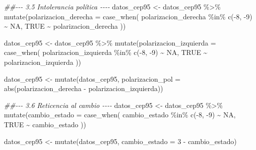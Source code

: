 \documentclass[
  spanish,
  a4paper,
  oneside]{scrbook}
\newenvironment{Shaded}{\begin{snugshade}}{\end{snugshade}}
\newcommand{\AttributeTok}[1]{\textcolor[rgb]{0.40,0.45,0.13}{#1}}
\newcommand{\ConstantTok}[1]{\textcolor[rgb]{0.56,0.35,0.01}{#1}}
\newcommand{\DecValTok}[1]{\textcolor[rgb]{0.68,0.00,0.00}{#1}}
\newcommand{\DocumentationTok}[1]{\textcolor[rgb]{0.37,0.37,0.37}{\textit{#1}}}
\newcommand{\FunctionTok}[1]{\textcolor[rgb]{0.28,0.35,0.67}{#1}}
\newcommand{\NormalTok}[1]{\textcolor[rgb]{0.00,0.23,0.31}{#1}}
\newcommand{\OtherTok}[1]{\textcolor[rgb]{0.00,0.23,0.31}{#1}}
\newcommand{\SpecialCharTok}[1]{\textcolor[rgb]{0.37,0.37,0.37}{#1}}
\begin{document}
\begin{Shaded}
\begin{Highlighting}[]
\DocumentationTok{\#\#{-}{-}{-} 3.5 Intolerancia política {-}{-}{-}{-}}
\NormalTok{datos\_cep95 }\OtherTok{\textless{}{-}}\NormalTok{ datos\_cep95 }\SpecialCharTok{\%\textgreater{}\%} 
  \FunctionTok{mutate}\NormalTok{(}\AttributeTok{polarizacion\_derecha =} \FunctionTok{case\_when}\NormalTok{(}
\NormalTok{    polarizacion\_derecha }\SpecialCharTok{\%in\%} \FunctionTok{c}\NormalTok{(}\SpecialCharTok{{-}}\DecValTok{8}\NormalTok{, }\SpecialCharTok{{-}}\DecValTok{9}\NormalTok{) }\SpecialCharTok{\textasciitilde{}} \ConstantTok{NA}\NormalTok{,}
    \ConstantTok{TRUE} \SpecialCharTok{\textasciitilde{}}\NormalTok{ polarizacion\_derecha}
\NormalTok{  ))}

\NormalTok{datos\_cep95 }\OtherTok{\textless{}{-}}\NormalTok{ datos\_cep95 }\SpecialCharTok{\%\textgreater{}\%} 
  \FunctionTok{mutate}\NormalTok{(}\AttributeTok{polarizacion\_izquierda =} \FunctionTok{case\_when}\NormalTok{(}
\NormalTok{    polarizacion\_izquierda }\SpecialCharTok{\%in\%} \FunctionTok{c}\NormalTok{(}\SpecialCharTok{{-}}\DecValTok{8}\NormalTok{, }\SpecialCharTok{{-}}\DecValTok{9}\NormalTok{) }\SpecialCharTok{\textasciitilde{}} \ConstantTok{NA}\NormalTok{,}
    \ConstantTok{TRUE} \SpecialCharTok{\textasciitilde{}}\NormalTok{ polarizacion\_izquierda}
\NormalTok{  ))}

\NormalTok{datos\_cep95 }\OtherTok{\textless{}{-}} \FunctionTok{mutate}\NormalTok{(datos\_cep95,}
                \AttributeTok{polarizacion\_pol =} \FunctionTok{abs}\NormalTok{(polarizacion\_derecha }\SpecialCharTok{{-}}\NormalTok{ polarizacion\_izquierda))}

\DocumentationTok{\#\#{-}{-}{-} 3.6 Reticencia al cambio {-}{-}{-}{-}}
\NormalTok{datos\_cep95 }\OtherTok{\textless{}{-}}\NormalTok{ datos\_cep95 }\SpecialCharTok{\%\textgreater{}\%} 
  \FunctionTok{mutate}\NormalTok{(}\AttributeTok{cambio\_estado =} \FunctionTok{case\_when}\NormalTok{(}
\NormalTok{    cambio\_estado }\SpecialCharTok{\%in\%} \FunctionTok{c}\NormalTok{(}\SpecialCharTok{{-}}\DecValTok{8}\NormalTok{, }\SpecialCharTok{{-}}\DecValTok{9}\NormalTok{) }\SpecialCharTok{\textasciitilde{}} \ConstantTok{NA}\NormalTok{,}
    \ConstantTok{TRUE} \SpecialCharTok{\textasciitilde{}}\NormalTok{ cambio\_estado}
\NormalTok{  ))}

\NormalTok{datos\_cep95 }\OtherTok{\textless{}{-}} \FunctionTok{mutate}\NormalTok{(datos\_cep95,}
                \AttributeTok{cambio\_estado =} \DecValTok{3} \SpecialCharTok{{-}}\NormalTok{ cambio\_estado)}


\end{Highlighting}
\end{Shaded}
\end{document}
